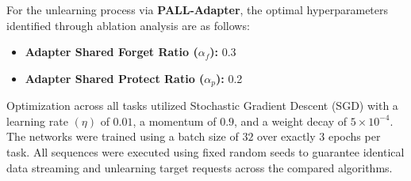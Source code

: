 \documentclass[conference]{IEEEtran}
\theoremstyle{plain}
\theoremstyle{definition}
\theoremstyle{remark}
\begin{document}
For the unlearning process via \textbf{PALL-Adapter}, the optimal hyperparameters identified through ablation analysis are as follows:
\begin{itemize}
    \item \textbf{Adapter Shared Forget Ratio ($\alpha_f$):} 0.3
    \item \textbf{Adapter Shared Protect Ratio ($\alpha_p$):} 0.2
\end{itemize}

Optimization across all tasks utilized Stochastic Gradient Descent (SGD) with a learning rate \((\eta)\) of \(0.01\), a momentum of \(0.9\), and a weight decay of \(5 \times 10^{-4}\). The networks were trained using a batch size of \(32\) over exactly \(3\) epochs per task. All sequences were executed using fixed random seeds to guarantee identical data streaming and unlearning target requests across the compared algorithms.
\end{document}
